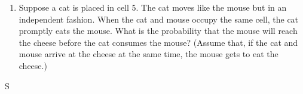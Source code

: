 \documentclass[answers]{exam}
\begin{document}
\begin{questions}
\begin{enumerate}[label=(\alph*)]
		\item Suppose a cat is placed in cell 5. 
		The cat moves like the mouse but in an independent fashion. 
		When the cat and mouse occupy the same cell, the cat promptly eats the mouse. 
		What is the probability that the mouse will reach the cheese before the cat consumes the mouse? 
		(Assume that, if the cat and mouse arrive at the cheese at the same time, the mouse gets to eat the cheese.)
	\end{enumerate}
\begin{solution}
	S
\end{solution}

\end{questions}
\end{document}
